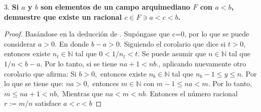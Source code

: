 \documentclass[a4paper,12pt]{article}
\begin{document}
3. \textbf{Si $a$ y $b$ son elementos de un campo arquimediano $F$ con $a<b$, demuestre que existe un racional $c \in F \ni a<c<b$.}
\begin{proof}
Basándose en la deducción de \cite{bartle2000introduction}. 
Supóngase que c=0, por lo que se puede considerar $a>0 .$ En donde $b-a>0$. Siguiendo el corolario que dice si $t>0,$ entonces existe $n_{t} \in \mathbb{N}$ tal que $0<1 / n_{t}<t$. Se puede asumir que $n \in \mathbb{N}$ tal que $1 / n<b-a .$ Por lo tanto, si se tiene $n a+1<n b .$, aplicando nuevamente otro corolario que afirma: Si $b>0,$ entonces existe $n_{b} \in \mathbb{N}$ tal que $n_{b}-1 \leq y \leq n$. Por lo que se tiene que: $n a>0,$ entonces $m \in \mathbb{N}$ con $m-1 \leq n a<m .$ Por lo tanto, $m \leq n a+1<n b,$ Mientras que $n a<m<n b .$ Entonces el número racional $r:=m / n$ satisface $a<c<b$

\end{proof}
\end{document}
